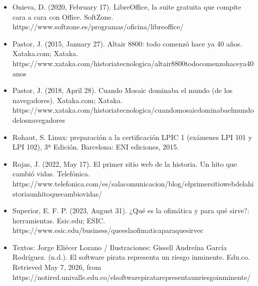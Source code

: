 \documentclass[letterpaper,10pt,spanish]{sphinxmanual}
\begin{document}
\begin{itemize}
\item {} 
\sphinxAtStartPar
Onieva, D. (2020, February 17). LibreOffice, la suite gratuita que compite cara a cara con Office. SoftZone. https://www.softzone.es/programas/oficina/libreoffice/

\item {} 
\sphinxAtStartPar
Pastor, J. (2015, January 27). Altair 8800: todo comenzó hace ya 40 años. Xataka.com; Xataka. https://www.xataka.com/historia\sphinxhyphen{}tecnologica/altair\sphinxhyphen{}8800\sphinxhyphen{}todo\sphinxhyphen{}comenzo\sphinxhyphen{}hace\sphinxhyphen{}ya\sphinxhyphen{}40\sphinxhyphen{}anos

\item {} 
\sphinxAtStartPar
Pastor, J. (2018, April 28). Cuando Mosaic dominaba el mundo (de los navegadores). Xataka.com; Xataka. https://www.xataka.com/historia\sphinxhyphen{}tecnologica/cuando\sphinxhyphen{}mosaic\sphinxhyphen{}dominaba\sphinxhyphen{}el\sphinxhyphen{}mundo\sphinxhyphen{}de\sphinxhyphen{}los\sphinxhyphen{}navegadores

\item {} 
\sphinxAtStartPar
Rohaut, S. Linux: preparación a la certificación LPIC 1 (exámenes LPI 101 y LPI 102), 3ª Edición. Barcelona: ENI ediciones, 2015.

\item {} 
\sphinxAtStartPar
Rojas, J. (2022, May 17). El primer sitio web de la historia. Un hito que cambió vidas. Telefónica. https://www.telefonica.com/es/sala\sphinxhyphen{}comunicacion/blog/el\sphinxhyphen{}primer\sphinxhyphen{}sitio\sphinxhyphen{}web\sphinxhyphen{}de\sphinxhyphen{}la\sphinxhyphen{}historia\sphinxhyphen{}un\sphinxhyphen{}hito\sphinxhyphen{}que\sphinxhyphen{}cambio\sphinxhyphen{}vidas/

\item {} 
\sphinxAtStartPar
Superior, E. F. P. (2023, August 31). ¿Qué es la ofimática y para qué sirve?: herramientas. Esic.edu; ESIC. https://www.esic.edu/business/que\sphinxhyphen{}es\sphinxhyphen{}la\sphinxhyphen{}ofimatica\sphinxhyphen{}para\sphinxhyphen{}que\sphinxhyphen{}sirve\sphinxhyphen{}c

\item {} 
\sphinxAtStartPar
Textos: Jorge Eliécer Lozano / Ilustraciones: Gissell Andreína García Rodríguez. (n.d.). El software pirata representa un riesgo inminente. Edu.co. Retrieved May 7, 2026, from https://notired.univalle.edu.co/el\sphinxhyphen{}software\sphinxhyphen{}pirata\sphinxhyphen{}representa\sphinxhyphen{}un\sphinxhyphen{}riesgo\sphinxhyphen{}inminente/


\end{itemize}
\end{document}
